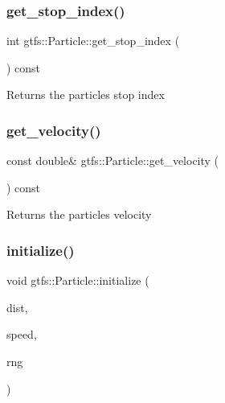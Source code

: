 \subsubsection{\texorpdfstring{get\+\_\+stop\+\_\+index()}{get\_stop\_index()}}
{\footnotesize\ttfamily int gtfs\+::\+Particle\+::get\+\_\+stop\+\_\+index (\begin{DoxyParamCaption}{ }\end{DoxyParamCaption}) const\hspace{0.3cm}{\ttfamily [inline]}}

\begin{DoxyReturn}{Returns}
the particle\textquotesingle{}s stop index 
\end{DoxyReturn}
\mbox{\label{classgtfs_1_1Particle_a3b59c859c3445b97c6da6c0b9081b1e4}} 
\subsubsection{\texorpdfstring{get\+\_\+velocity()}{get\_velocity()}}
{\footnotesize\ttfamily const double\& gtfs\+::\+Particle\+::get\+\_\+velocity (\begin{DoxyParamCaption}{ }\end{DoxyParamCaption}) const\hspace{0.3cm}{\ttfamily [inline]}}

\begin{DoxyReturn}{Returns}
the particle\textquotesingle{}s velocity 
\end{DoxyReturn}
\mbox{\label{classgtfs_1_1Particle_a4b1e356f32d4557d06c9ed59467a5b27}} 
\subsubsection{\texorpdfstring{initialize()}{initialize()}}
{\footnotesize\ttfamily void gtfs\+::\+Particle\+::initialize (\begin{DoxyParamCaption}\item[{\hyperlink{classsampling_1_1uniform}{sampling\+::uniform} \&}]{dist,  }\item[{\hyperlink{classsampling_1_1uniform}{sampling\+::uniform} \&}]{speed,  }\item[{\hyperlink{classsampling_1_1RNG}{sampling\+::\+R\+NG} \&}]{rng }\end{DoxyParamCaption})}

